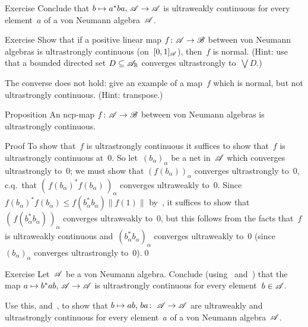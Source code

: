 \documentclass[a]{subfiles}
\begin{document}
\begin{parsec}
\begin{point}[p-uwcont]{Exercise}
Conclude that $b\mapsto a^*ba,\,\mathscr{A}\to\mathscr{A}$
is ultraweakly
continuous for every element~$a$ of a von Neumann 
algebra~$\mathscr{A}$.
\end{point}
\end{parsec}
\begin{parsec}%
\begin{point}{Exercise}%
Show that if a positive linear map $f\colon \mathscr{A}\to\mathscr{B}$
between von Neumann algebras 
is ultrastrongly continuous (on~$[0,1]_{\mathscr{A}}$), 
then~$f$ is normal.
(Hint: use that a bounded directed set 
$D\subseteq \mathscr{A}_{\mathbb{R}}$ converges ultrastrongly to~$\bigvee D$.)

The converse does not hold: give an example of a map~$f$ 
which is normal, but 
not ultrastrongly continuous. (Hint: transpose.)
\end{point}
\begin{point}[cp-uscont]{Proposition}%
An ncp-map $f\colon \mathscr{A}\to\mathscr{B}$
between von Neumann algebras is 
ultrastrongly continuous.
\begin{point}{Proof}%
To show that~$f$
is ultrastrongly continuous
it suffices to show that~$f$ is ultrastrongly continuous at~$0$.
So let~$(b_\alpha)_\alpha$ be a net in~$\mathscr{A}$
which converges ultrastrongly to~$0$;
we must show that $(f(b_\alpha))_\alpha$
converges ultrastrongly to~$0$, c.q.~that
$(\,f(b_\alpha)^*f(b_\alpha)\,)_\alpha$ converges ultraweakly to~$0$.
Since
$f(b_\alpha)^*f(b_\alpha) \leq f(b_\alpha^*b_\alpha) \|f(1)\|$
by~, 
it suffices to show that~$(\,f(b_\alpha^*b_\alpha)\,)_\alpha$
converges ultraweakly to~$0$,
but this follows from the
facts that~$f$ is ultraweakly continuous
and~$(b_\alpha^*b_\alpha)_\alpha$
converges ultraweakly to~$0$
(since~$(b_\alpha)_\alpha$ converges ultrastrongly to~$0$).\qed
\end{point}
\end{point}
\begin{point}{Exercise}%
Let~$\mathscr{A}$ be a von Neumann algebra.
Conclude (using~ and~)
that the map $a\mapsto b^*ab,\,\mathscr{A}\to\mathscr{A}$
is ultrastrongly continuous for every
 element~$b\in\mathscr{A}$.

Use this,
and~,
to
show that $b\mapsto ab,\,ba\colon\ \mathscr{A}\to\mathscr{A}$
are ultraweakly and ultrastrongly continuous
for every element~$a$ of a von Neumann algebra~$\mathscr{A}$.
\end{point}
\end{parsec}
\end{document}
